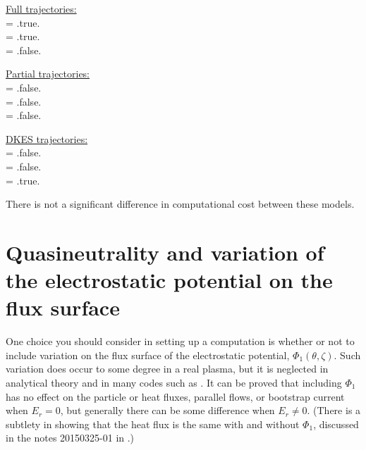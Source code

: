 {\setlength{\parindent}{0cm}

\underline{Full trajectories:}\\
{\ttfamily 
{} = .true.\\
 = .true.\\
 = .false.\\
}

\underline{Partial trajectories:}\\
{\ttfamily
{} = .false.\\
 = .false.\\
 = .false.\\
}

\underline{DKES trajectories:}\\
{\ttfamily
{} = .false.\\
 = .false.\\
 = .true.\\
}
}

There is not a significant difference in computational cost between these models.


\section{Quasineutrality and variation of the electrostatic potential on the flux surface}
\label{sec:qn}

One choice you should consider in setting up a computation is whether or not
to include variation on the flux surface of the electrostatic potential, $\Phi_1(\theta,\zeta)$.
Such variation does occur to some degree in a real plasma, but it is 
neglected in analytical theory and in many codes such as \dkes.  It can be proved
that including $\Phi_1$ has no effect on the particle or heat fluxes, parallel flows, or bootstrap current
when $E_r=0$, but generally there can be some difference when $E_r \ne 0$.
(There is a subtlety in showing that the heat flux is the same with and without $\Phi_1$,
discussed in the notes 20150325-01 in .)

